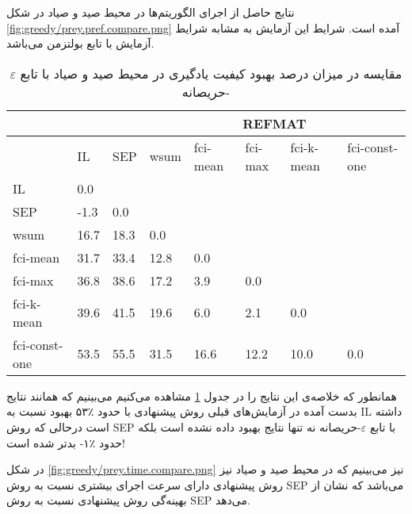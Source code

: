  نتایج حاصل از اجرای الگوریتم‌ها در محیط صید و صیاد در شکل
\ref{fig:greedy/prey.pref.compare.png}
آمده است. شرایط این آزمایش به مشابه شرایط آزمایش با تابع بولتزمن می‌باشد.


\begin{table}[h!]
\centering
\caption{مقایسه در میزان درصد بهبود کیفیت یادگیری در محیط صید و صیاد با تابع $\varepsilon$-حریصانه}\label{tab:prey_pref_compare_greedy}
\begin{latin}
\begin{tabular}{|*8{l|}}
\hline
\multicolumn{3}{|c|}{}& \multicolumn{5}{c|}{REFMAT}
\\\hline
& IL & SEP & wsum & fci-mean & fci-max & fci-k-mean & fci-const-one
\\\hline
IL &0.0 & & & & & &
\\\hline
SEP &-1.3 &0.0 & & & & &
\\\hline
wsum &16.7 &18.3 &0.0 & & & &
\\\hline
fci-mean &31.7 &33.4 &12.8 &0.0 & & &
\\\hline
fci-max &36.8 &38.6 &17.2 &3.9 &0.0 & &
\\\hline
fci-k-mean &39.6 &41.5 &19.6 &6.0 &2.1 &0.0 &
\\\hline
fci-const-one &53.5 &55.5 &31.5 &16.6 &12.2 &10.0 &0.0
\\\hline
\end{tabular}
\end{latin}
\end{table}

همانطور که خلاصه‌ی این نتایج را در جدول
\ref{tab:prey_pref_compare_greedy}
مشاهده می‌کنیم می‌بینیم که همانند نتایج بدست آمده در آزمایش‌های قبلی روش پیشنهادی با حدود ٪۵۳ بهبود نسبت به IL داشته است درحالی که روش SEP با تابع $\varepsilon$-حریصانه نه تنها نتایج بهبود داده‌ نشده است بلکه حدود ٪۱- بدتر شده است!

 در شکل
\ref{fig:greedy/prey.time.compare.png}
نیز می‌بینیم که در محیط صید و صیاد نیز روش پیشنهادی دارای سرعت اجرای بیشتری نسبت به روش SEP می‌باشد که نشان از بهینه‌گی روش پیشنهادی نسبت به روش SEP می‌دهد.


